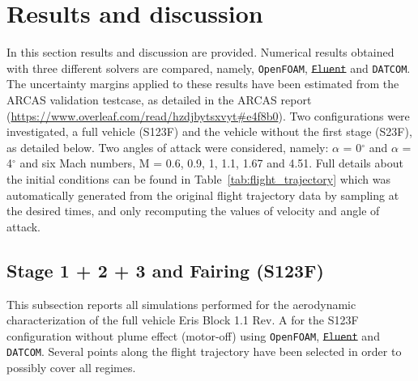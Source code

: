\documentclass[12pt]{article}
\begin{document}
\section{Results and discussion}\label{sec:results}
In this section results and discussion are provided. Numerical results obtained with three different solvers are compared, namely, \texttt{OpenFOAM}, \texttt{\st{Fluent}} and \texttt{DATCOM}. The uncertainty margins applied to these results have been estimated from the ARCAS validation testcase, as detailed in the ARCAS report (\url{https://www.overleaf.com/read/hzdjbytsxvyt#e4f8b0}). Two configurations were investigated, a full vehicle (S123F) and the vehicle without the first stage (S23F), as detailed below. Two angles of attack were considered, namely: $\alpha$ = 0$^\circ$ and $\alpha$ = 4$^\circ$ and six Mach numbers, M = 0.6, 0.9, 1, 1.1, 1.67 and 4.51. Full details about the initial conditions can be found in Table~\ref{tab:flight_trajectory} which was automatically generated from the original flight trajectory data by sampling at the desired times, and only recomputing the values of velocity and angle of attack.

\subsection{Stage 1 + 2 + 3 and Fairing (S123F)}\label{subsec:solvers}
This subsection reports all simulations performed for the aerodynamic characterization of the full vehicle Eris Block 1.1 Rev. A for the S123F configuration without plume effect (motor-off) using \texttt{OpenFOAM}, \texttt{\st{Fluent}} and \texttt{DATCOM}. Several points along the flight trajectory have been selected in order to possibly cover all regimes.
\end{document}
